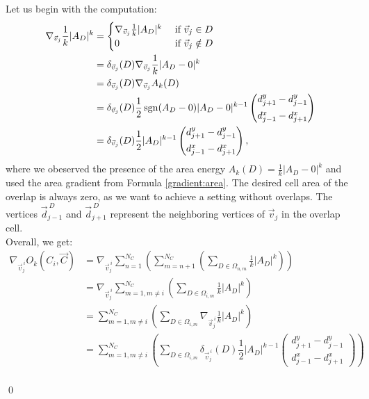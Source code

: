 \begin{proposition}
	Let us begin with the computation:
	\begin{align*}
		\nabla_{\vec{v}_j} \frac{1}{k}|A_{D}|^k
		&= \begin{cases}
			\nabla_{\vec{v}_j} \frac{1}{k} |A_{D}|^k &\text{ if } \vec{v}_j \in D \\
			0 &\text{ if } \vec{v}_j \notin D
		\end{cases} \\
		&= \delta_{\vec{v}_j}(D)  \nabla_{\vec{v}_j} \frac{1}{k}|A_{D} - 0|^k \\
		&= \delta_{\vec{v}_j}(D)  \nabla_{\vec{v}_j} A_k(D) \\
		&= \delta_{\vec{v}_j}(D)  \dfrac{1}{2} \operatorname{sgn}(A_{D} - 0) |A_{D} - 0|^{k-1} 
		\begin{pmatrix} d_{j+1}^{y} - d_{j-1}^{y} \\[0.5em]  d_{j-1}^{x} - d_{j+1}^{x} \end{pmatrix} \\
		&= \delta_{\vec{v}_j}(D)  \dfrac{1}{2} |A_{D}|^{k-1} 
		\begin{pmatrix} d_{j+1}^{y} - d_{j-1}^{y} \\[0.5em]  d_{j-1}^{x} - d_{j+1}^{x} \end{pmatrix}, \\
	\end{align*}
	where we obeserved the presence of the area energy $A_k(D) = \frac{1}{k}|A_{D} - 0|^k$ and used the area gradient from Formula \ref{gradient:area}. 
	The desired cell area of the overlap is always zero, as we want to achieve a setting without overlaps. 
	The vertices $\vec{d}_{j-1}^{\: D}$ and $\vec{d}_{j+1}^{\: D}$ represent the neighboring vertices of $\vec{v}_j$ in the overlap cell. \\
	Overall, we get:
	\begin{align*}
		\nabla_{\vec{v}_j^{\: i}} O_k(C_i, \vec{C}) 
		&= \nabla_{\vec{v}_j^{\: i}} \sum\limits_{n=1}^{N_C} \left( \sum\limits_{m=n+1}^{N_C}  \left(\sum\limits_{D \in \Omega_{n,m}} \frac{1}{k}|A_{D}|^k\right) \right) \\
		&= \nabla_{\vec{v}_j^{\: i}} \sum\limits_{m=1, m \neq i}^{N_C} \left( \sum\limits_{D \in \Omega_{i,m}} \frac{1}{k}|A_{D}|^k\right)\\
		&= \sum\limits_{m=1, m \neq i}^{N_C} \left( \sum\limits_{D \in \Omega_{i,m}} \nabla_{\vec{v}_j^{\: i}} \frac{1}{k}|A_{D}|^k\right)\\
		&= \sum\limits_{m=1, m \neq i}^{N_C} \left( \sum\limits_{D \in \Omega_{i,m}} \delta_{\vec{v}_j^{\: i}}(D)  \dfrac{1}{2} |A_{D}|^{k-1} 
		\begin{pmatrix} d_{j+1}^{y} - d_{j-1}^{y} \\[0.5em]  d_{j-1}^{x} - d_{j+1}^{x} \end{pmatrix}\right)\\
	\end{align*}

	\qed
\end{proposition}

